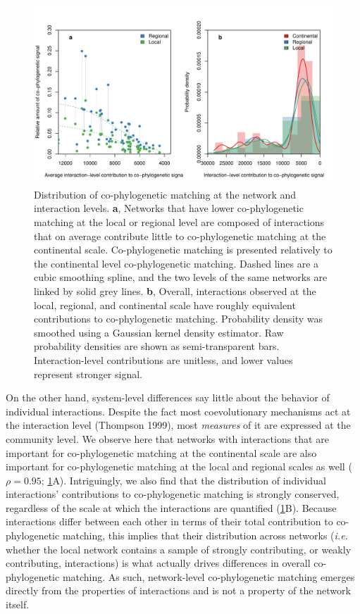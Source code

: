 \documentclass[11pt,serif]{article}
\begin{document}
\begin{figure}[htbp]
\centering
\includegraphics[width=1.00000\textwidth]{figure/contributions-1.pdf}
\caption{Distribution of co-phylogenetic matching at the network and
interaction levels. \textbf{a}, Networks that have lower co-phylogenetic
matching at the local or regional level are composed of interactions
that on average contribute little to co-phylogenetic matching at the
continental scale. Co-phylogenetic matching is presented relatively to
the continental level co-phylogenetic matching. Dashed lines are a cubic
smoothing spline, and the two levels of the same networks are linked by
solid grey lines. \textbf{b}, Overall, interactions observed at the
local, regional, and continental scale have roughly equivalent
contributions to co-phylogenetic matching. Probability density was
smoothed using a Gaussian kernel density estimator. Raw probability
densities are shown as semi-transparent bars. Interaction-level
contributions are unitless, and lower values represent stronger
signal.\label{fig:contributions}}
\end{figure}

On the other hand, system-level differences say little about the
behavior of individual interactions. Despite the fact most
coevolutionary mechanisms act at the interaction level (Thompson 1999),
most \emph{measures} of it are expressed at the community level. We
observe here that networks with interactions that are important for
co-phylogenetic matching at the continental scale are also important for
co-phylogenetic matching at the local and regional scales as well
(\(\rho = 0.95\); \cref{fig:contributions}A).
Intriguingly, we also find that the distribution of individual
interactions' contributions to co-phylogenetic matching is strongly
conserved, regardless of the scale at which the interactions are
quantified (\cref{fig:contributions}B). Because
interactions differ between each other in terms of their total
contribution to co-phylogenetic matching, this implies that their
distribution across networks (\emph{i.e.} whether the local network
contains a sample of strongly contributing, or weakly contributing,
interactions) is what actually drives differences in overall
co-phylogenetic matching. As such, network-level co-phylogenetic
matching emerges directly from the properties of interactions and is not
a property of the network itself.
\end{document}
